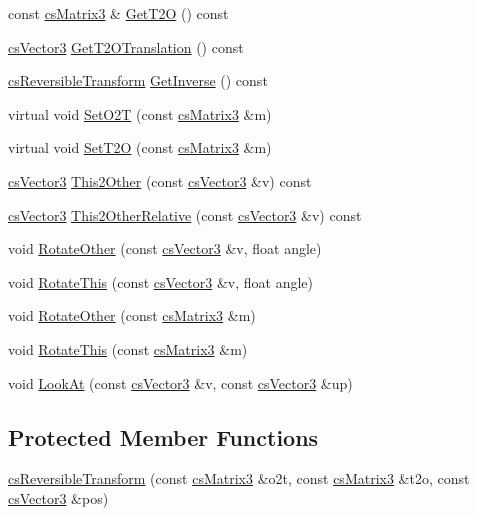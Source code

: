 \begin{DoxyCompactItemize}
\item 
const \hyperlink{classcsMatrix3}{cs\+Matrix3} \& \hyperlink{classcsReversibleTransform_a9b24e3ccd1874dd74ed48c8ef504db36}{Get\+T2O} () const 
\item 
\hyperlink{classcsVector3}{cs\+Vector3} \hyperlink{classcsReversibleTransform_a7d76fc227ef7e67297899060f70c3273}{Get\+T2\+O\+Translation} () const 
\item 
\hyperlink{classcsReversibleTransform}{cs\+Reversible\+Transform} \hyperlink{classcsReversibleTransform_a4da7113ed78952f3c0fbec4534595492}{Get\+Inverse} () const 
\item 
virtual void \hyperlink{classcsReversibleTransform_a7adc3d305ab65cd54d4360d5fcf8c0f1}{Set\+O2T} (const \hyperlink{classcsMatrix3}{cs\+Matrix3} \&m)
\item 
virtual void \hyperlink{classcsReversibleTransform_aa0ae7c7834a8104fa463f9501734337c}{Set\+T2O} (const \hyperlink{classcsMatrix3}{cs\+Matrix3} \&m)
\item 
\hyperlink{classcsVector3}{cs\+Vector3} \hyperlink{classcsReversibleTransform_a0583af0d751ee86b38a29ff5f260facd}{This2\+Other} (const \hyperlink{classcsVector3}{cs\+Vector3} \&v) const 
\item 
\hyperlink{classcsVector3}{cs\+Vector3} \hyperlink{classcsReversibleTransform_a812d772c7db08d2ac2c17ce9b3c9f048}{This2\+Other\+Relative} (const \hyperlink{classcsVector3}{cs\+Vector3} \&v) const 
\item 
void \hyperlink{classcsReversibleTransform_a36f17397f444e8a98b2b4d086c215df8}{Rotate\+Other} (const \hyperlink{classcsVector3}{cs\+Vector3} \&v, float angle)
\item 
void \hyperlink{classcsReversibleTransform_ad774bc775536dd10c2490752e1ebbef5}{Rotate\+This} (const \hyperlink{classcsVector3}{cs\+Vector3} \&v, float angle)
\item 
void \hyperlink{classcsReversibleTransform_acc4167fabbf3b9195f9f24d6312e4bf5}{Rotate\+Other} (const \hyperlink{classcsMatrix3}{cs\+Matrix3} \&m)
\item 
void \hyperlink{classcsReversibleTransform_ab9dc14db5f80245d9ce2025df8e3c470}{Rotate\+This} (const \hyperlink{classcsMatrix3}{cs\+Matrix3} \&m)
\item 
void \hyperlink{classcsReversibleTransform_a10ce5361544cb5cb59f259f677879769}{Look\+At} (const \hyperlink{classcsVector3}{cs\+Vector3} \&v, const \hyperlink{classcsVector3}{cs\+Vector3} \&up)
\end{DoxyCompactItemize}
\subsection*{Protected Member Functions}
\begin{DoxyCompactItemize}
\item 
\hyperlink{classcsReversibleTransform_a07618e95ad9ccd82c3c07e4f6e2914cd}{cs\+Reversible\+Transform} (const \hyperlink{classcsMatrix3}{cs\+Matrix3} \&o2t, const \hyperlink{classcsMatrix3}{cs\+Matrix3} \&t2o, const \hyperlink{classcsVector3}{cs\+Vector3} \&pos)
\end{DoxyCompactItemize}
